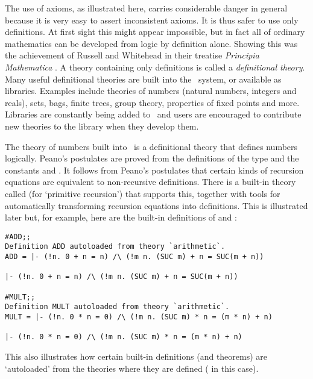     The use of axioms, as illustrated here, carries considerable
    danger in general because it is very easy to assert inconsistent
    axioms.  It is thus safer to use only definitions.  At first sight
    this might appear impossible, but in fact all of ordinary
    mathematics can be developed from logic by definition alone.
    Showing this was the achievement of Russell and Whitehead in their
    treatise {\sl Principia Mathematica} \cite{Principia}.  A theory
    containing only definitions is called a {\it definitional
      theory\/}.  Many useful definitional theories are built into the
    \HOL\ system, or available as libraries.  Examples include
    theories of numbers (natural numbers, integers and reals), sets,
    bags, finite trees, group theory, properties of fixed points and
    more.  Libraries are constantly being added to \HOL\ and users are
    encouraged to contribute new theories to the library when they
    develop them.

    The theory of numbers built into \HOL\ is a definitional theory
    that defines numbers logically. Peano's postulates are proved from
    the definitions of the type  and the constants  and
    .  It follows from Peano's postulates that certain kinds
    of recursion equations are equivalent to non-recursive
    definitions. There is a built-in theory called  (for
    `primitive recursion') that supports this, together with tools for
    automatically transforming recursion equations into definitions.
    This is illustrated later but, for example, here are the built-in
    definitions of \ml{+} and \ml{*}:

\begin{session}\begin{verbatim}
#ADD;;
Definition ADD autoloaded from theory `arithmetic`.
ADD = |- (!n. 0 + n = n) /\ (!m n. (SUC m) + n = SUC(m + n))

|- (!n. 0 + n = n) /\ (!m n. (SUC m) + n = SUC(m + n))

#MULT;;
Definition MULT autoloaded from theory `arithmetic`.
MULT = |- (!n. 0 * n = 0) /\ (!m n. (SUC m) * n = (m * n) + n)

|- (!n. 0 * n = 0) /\ (!m n. (SUC m) * n = (m * n) + n)
\end{verbatim}\end{session}

\noindent This also illustrates how certain built-in definitions (and theorems)
are `autoloaded' from the theories where they are defined ( in this
case).

